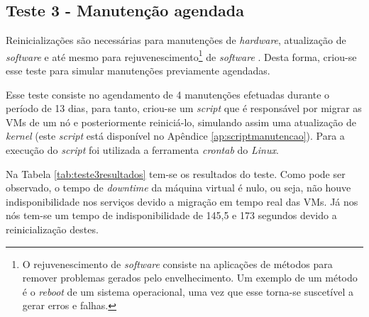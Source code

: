\subsection{Teste 3 - Manutenção agendada}

Reinicializações são necessárias para manutenções de \textit{hardware}, atualização de \textit{software} e até mesmo para 
rejuvenescimento\footnote{O rejuvenescimento de \textit{software} consiste na aplicações de métodos para remover problemas gerados pelo 
envelhecimento. Um exemplo de um método é o \textit{reboot} de um sistema operacional, uma vez que esse torna-se suscetível a gerar erros e 
falhas.} de \textit{software} \cite{melo2014}. Desta forma, criou-se esse teste para simular manutenções previamente agendadas.


Esse teste consiste no agendamento de 4 manutenções efetuadas durante o período de 13 dias, para tanto, criou-se um \textit{script} que é 
responsável por migrar as \acp{VM} de um nó e posteriormente reiniciá-lo, simulando assim uma atualização de \textit{kernel} 
(este \textit{script} está disponível no Apêndice \ref{ap:scriptmanutencao}). 
Para a execução do \textit{script} foi utilizada a ferramenta \textit{crontab} do \textit{Linux}. 

Na Tabela \ref{tab:teste3resultados} tem-se os resultados do teste. Como pode ser observado, o tempo de \textit{downtime} da máquina virtual 
é nulo, ou seja, não houve indisponibilidade nos serviços devido a migração em tempo real das \acp{VM}. 
Já nos nós  tem-se um tempo de indisponibilidade de 145,5 e 173 segundos devido a reinicialização destes.

